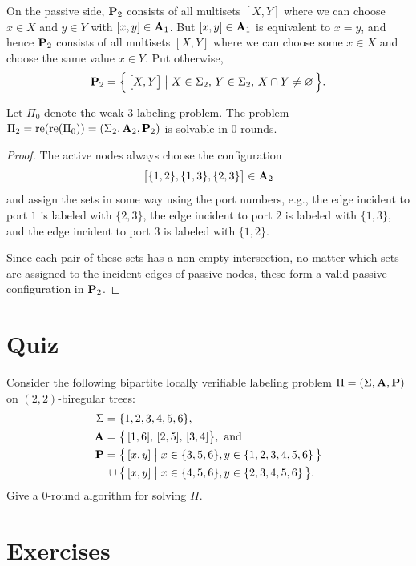 On the passive side, $\mathbf{P}_2$ consists of all multisets $[X,Y]$ where we can choose $x \in X$ and $y \in Y$ with $[x,y] \in \mathbf{A}_1$. But $[x,y] \in \mathbf{A}_1$ is equivalent to $x = y$, and hence $\mathbf{P}_2$ consists of all multisets $[X,Y]$ where we can choose some $x \in X$ and choose the same value $x \in Y$. Put otherwise,
\[
\mathbf{P}_2 = \Bigl\{ \, \bigl[ X, Y \bigr] \bigm| X \in \Sigma_2,\, Y \in \Sigma_2,\, X \cap Y \ne \varnothing \,\Bigr\}.
\]

\begin{lemma}
	Let $\Pi_0$ denote the weak 3-labeling problem. The problem $\Pi_2 = \operatorname{re}(\operatorname{re}(\Pi_0)) = (\Sigma_2, \mathbf{A}_2, \mathbf{P}_2)$ is solvable in $0$ rounds.
\end{lemma}

\begin{proof}
	The active nodes always choose the configuration
	\[
	\bigl[\{ 1, 2 \}, \{ 1, 3 \}, \{ 2, 3 \} \bigr] \in \mathbf{A}_2
	\]
	and assign the sets in some way using the port numbers, e.g., the edge incident to port $1$ is labeled with $\{2,3\}$, the edge incident to port $2$ is labeled with $\{1,3\}$, and the edge incident to port $3$ is labeled with $\{1,2\}$.

	Since each pair of these sets has a non-empty intersection, no matter which sets are assigned to the incident edges of passive nodes, these form a valid passive configuration in $\mathbf{P}_2$.
\end{proof}

\section{Quiz}

Consider the following bipartite locally verifiable labeling problem $\Pi = (\Sigma, \mathbf{A}, \mathbf{P})$ on $(2,2)$-biregular trees:
\begin{align*}
	\Sigma ={}& \{ 1, 2, 3, 4, 5, 6 \}, \\
	\mathbf{A} ={}& \bigl\{\, [1, 6],\, [2, 5],\,[3, 4] \bigr\}, \text{ and} \\
	\mathbf{P} ={}& \bigl\{\, [x, y] \bigm| x \in \{ 3, 5, 6 \}, y \in \{ 1, 2, 3, 4, 5, 6 \} \,\bigr\} \\
	  {}\cup{}& \bigl\{\, [x, y] \bigm| x \in \{4,5,6\}, y \in \{ 2, 3, 4, 5, 6 \} \,\bigr\}.
\end{align*}
Give a $0$-round algorithm for solving $\Pi$.

\section{Exercises}


